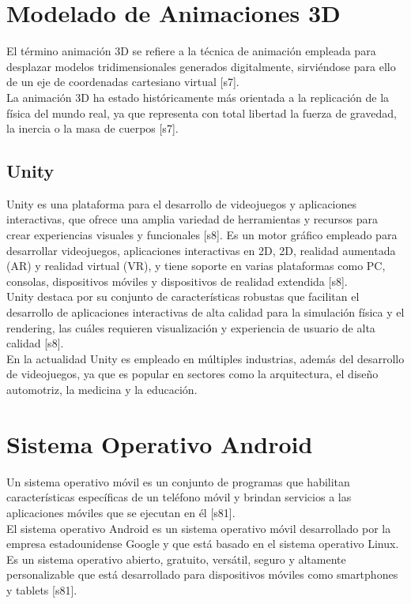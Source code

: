 \section{Modelado de Animaciones 3D}
El término animación 3D se refiere a la técnica de animación empleada para desplazar modelos tridimensionales generados digitalmente, sirviéndose para ello de un eje de coordenadas cartesiano virtual [s7].\\

La animación 3D ha estado históricamente más orientada a la replicación de la física del mundo real, ya que representa con total libertad la fuerza de gravedad, la inercia o la masa de cuerpos [s7].

\subsection{Unity}
Unity es una plataforma para el desarrollo de videojuegos y aplicaciones interactivas, que ofrece una amplia variedad de herramientas y recursos para crear experiencias visuales y funcionales [s8]. Es un motor gráfico empleado para desarrollar videojuegos, aplicaciones interactivas en 2D, 2D, realidad aumentada (AR) y realidad virtual (VR), y tiene soporte en varias plataformas como PC, consolas, dispositivos móviles y dispositivos de realidad extendida [s8].\\

Unity destaca por su conjunto de características robustas que facilitan el desarrollo de aplicaciones interactivas de alta calidad para la simulación física y el rendering, las cuáles requieren visualización y experiencia de usuario de alta calidad [s8].\\

En la actualidad Unity es empleado en múltiples industrias, además del desarrollo de videojuegos, ya que es popular en sectores como la arquitectura, el diseño automotriz, la medicina y la educación. 



\section{Sistema Operativo Android}
Un sistema operativo móvil es un conjunto de programas que habilitan características específicas de un teléfono móvil y brindan servicios a las aplicaciones móviles que se ejecutan en él [s81].\\

El sistema operativo Android es un sistema operativo móvil desarrollado por la empresa estadounidense Google y que está basado en el sistema operativo Linux. Es un sistema operativo abierto, gratuito, versátil, seguro y altamente personalizable que está desarrollado para dispositivos móviles como smartphones y tablets [s81].

